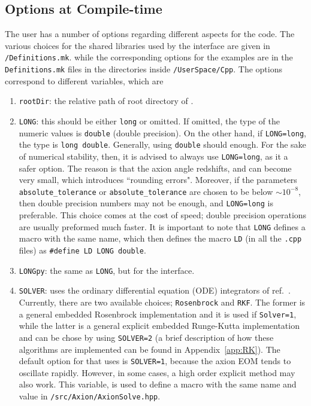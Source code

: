 \documentclass[11pt,a4paper]{article}
\begin{document}
\subsection{Options at Compile-time}\label{sec:options}
%
The user has a number of options regarding different aspects for the code. The various choices for the shared libraries used by the \PY interface are given in {\tt \mimes/Definitions.mk}. while the corresponding options for the \CPP examples are in the {\tt Definitions.mk} files in the directories inside {\tt \mimes/UserSpace/Cpp}.  The options correspond to different variables, which are
%
\begin{enumerate}
	\item {\tt rootDir}: the relative path of root directory of \mimes.  
	\item {\tt LONG}: this should be either {\tt long} or omitted. If omitted, the type of the numeric values is {\tt double} (double precision). On the other hand, if {\tt LONG=long},  the type is  {\tt long double}. Generally, using {\tt double} should enough. For the sake of numerical stability, then, it is advised to always use {\tt LONG=long}, as it a safer option. The reason is that the axion angle redshifts, and can become very small, which introduces ``rounding errors". Moreover, if the parameters {\tt absolute\_tolerance} or {\tt absolute\_tolerance} are chosen to be below $\sim 10^{-8}$, then double precision numbers may not be enough, and {\tt LONG=long} is preferable.  This choice comes at the cost of speed; double precision operations are usually preformed much faster. It is important to note that {\tt LONG} defines a macro with the same name, which then defines the macro {\tt LD} (in all the {\tt .cpp} files) as {\tt \#define LD LONG double}.
	\item {\tt LONGpy}: the same as {\tt LONG}, but for the \PY interface.
	\item {\tt SOLVER}: \mimes uses the ordinary differential equation (ODE) integrators of ref.~\cite{NaBBODES}. Currently, there are two available choices; {\tt Rosenbrock} and {\tt RKF}. The former is a general embedded Rosenbrock implementation and it is used if {\tt Solver=1}, while the latter is a general explicit embedded Runge-Kutta implementation and can be chose by using {\tt SOLVER=2} (a brief description of how these algorithms are implemented can be found in Appendix~\ref{app:RK}). The default option for that \mimes uses is {\tt SOLVER=1}, because the axion EOM tends to oscillate rapidly. However, in some cases, a high order explicit method may also work. This variable, is used to define a macro with the same name and value in {\tt \mimes/src/Axion/AxionSolve.hpp}.

\end{enumerate}
\end{document}
